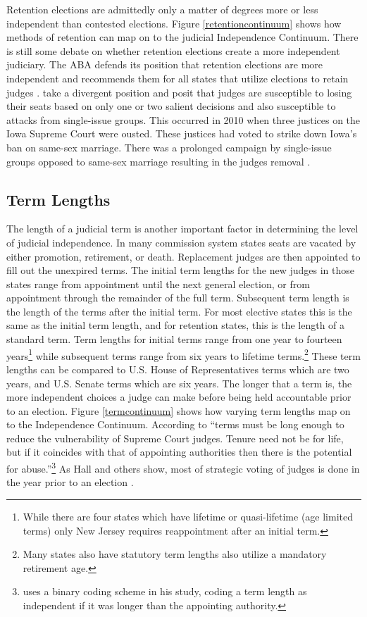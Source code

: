 \documentclass[12pt]{article}
\begin{document}
Retention elections are admittedly only a matter of degrees more or less independent than contested elections. Figure \ref{retentioncontinuum} shows how methods of retention can map on to the judicial Independence Continuum.  There is still some debate on whether retention elections create a more independent judiciary. The ABA defends its position that retention elections are more independent and recommends them for all states that utilize elections to retain judges \citep{ABA2003}.  \citet{Canes-Wrone2012} take a divergent position and posit that judges are susceptible to losing their seats based on only one or two salient decisions and also susceptible to attacks from single-issue groups.  This occurred in 2010 when three justices on the Iowa Supreme Court were ousted. These justices had voted to strike down Iowa's ban on same-sex marriage. There was a prolonged campaign by single-issue groups opposed to same-sex marriage resulting in the judges removal \citep{Iowa2010}.

\subsection*{Term Lengths}
The length of a judicial term is another important factor in determining the level of judicial independence.  In many commission system states seats are vacated by either promotion, retirement, or death. Replacement judges are then appointed to fill out the unexpired terms. The initial term lengths for the new judges in those states range from appointment until the next general election, or from appointment through the remainder of the full term. Subsequent term length is the length of the terms after the initial term. For most elective states this is the same as the initial term length, and for retention states, this is the length of a standard term. Term lengths for initial terms range from one year to fourteen years\footnote{While there are four states which have lifetime or quasi-lifetime (age limited terms) only New Jersey requires reappointment after an initial term.} while subsequent terms range from six years to lifetime terms.\footnote{Many states also have statutory term lengths also utilize a mandatory retirement age.}  These term lengths can be compared to U.S. House of Representatives terms which are two years, and U.S. Senate terms which are six years.  The longer that a term is, the more independent choices a judge can make before being held accountable prior to an election.  Figure \ref{termcontinuum} shows how varying term lengths map on to the Independence Continuum.  According to \citet[31]{Rios2006} ``terms must be long enough to reduce the vulnerability of Supreme Court judges.  Tenure need not be for life, but if it coincides with that of appointing authorities then there is the potential for abuse.''\footnote{\citet{Rios2006} uses a binary coding scheme in his study, coding a term length as independent if it was longer than the appointing authority.}  As Hall and others show, most of strategic voting of judges is done in the year prior to an election \citep{Hall1987b,Hall1985,Brace2008,Canes-Wrone2012}.  
\end{document}

